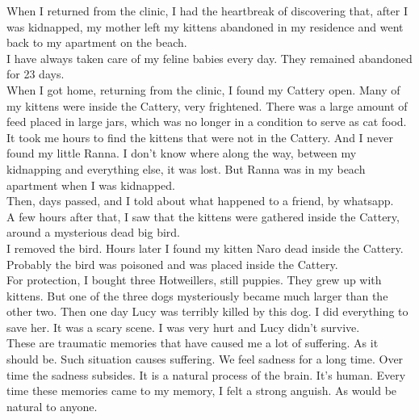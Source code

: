 \documentclass[11pt]{book}
\begin{document}
\noindent When I returned from the clinic, I had the heartbreak of discovering that, after I was kidnapped, my mother left my kittens abandoned in my residence and went back to my apartment on the beach. \\

\noindent I have always taken care of my feline babies every day. They remained abandoned for 23 days.\\

\noindent When I got home, returning from the clinic, I found my Cattery open. Many of my kittens were inside the Cattery, very frightened. There was a large amount of feed placed in large jars, which was no longer in a condition to serve as cat food. \\

\noindent It took me hours to find the kittens that were not in the Cattery. And I never found my little Ranna. I don't know where along the way, between my kidnapping and everything else, it was lost. But Ranna was in my beach apartment when I was kidnapped. \\

\noindent Then, days passed, and I told about what happened to a friend, by whatsapp. \\

\noindent A few hours after that, I saw that the kittens were gathered inside the Cattery, around a mysterious dead big bird. \\

\noindent I removed the bird. Hours later I found my kitten Naro dead inside the Cattery. Probably the bird was poisoned and was placed inside the Cattery. \\

\noindent For protection, I bought three Hotweillers, still puppies. They grew up with kittens. But one of the three dogs mysteriously became much larger than the other two. Then one day Lucy was terribly killed by this dog. I did everything to save her. It was a scary scene. I was very hurt and Lucy didn't survive. \\

\noindent These are traumatic memories that have caused me a lot of suffering. As it should be. Such situation causes suffering. We feel sadness for a long time. Over time the sadness subsides. It is a natural process of the brain. It's human. Every time these memories came to my memory, I felt a strong anguish. As would be natural to anyone. \\
\end{document}
